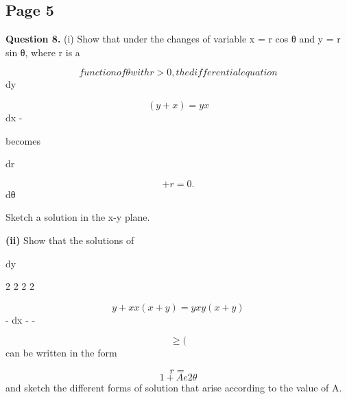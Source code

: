 \documentclass[12pt]{article}
\begin{document}
\subsection*{Page 5}
\begin{flushleft}
\bigskip\textbf{Question 8.} (i) Show that under the changes of variable x = r cos θ and y = r sin θ, where r is a\par
\[function of θ with r > 0, the differential equation\]
dy\par
\[(y + x) = y x\]
dx -\par
becomes\par
dr\par
\[+ r = 0 .\]
dθ\par
Sketch a solution in the x-y plane.\par
\textbf{(ii)} Show that the solutions of\par
dy\par
2 2 2 2\par
\[y + x x(x + y ) = y x y(x + y )\]
- dx - -\par
\[\geq (\]
can be written in the form\par
\[r =\]
\[1 + Ae2θ\]
and sketch the different forms of solution that arise according to the value of A.\par
\end{flushleft}
\end{document}
